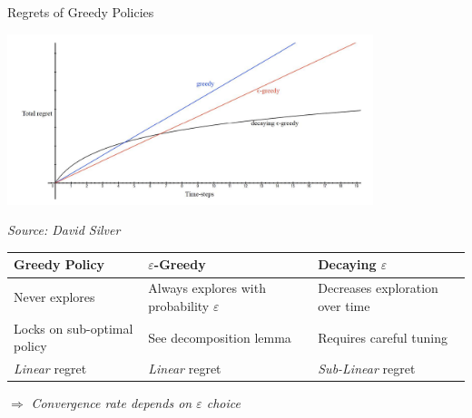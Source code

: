 \documentclass[11pt,table]{beamer}
\begin{document}
\begin{frame}{Regrets of Greedy Policies}

\centering
\includegraphics[width=0.8\textwidth]{figures/regrets of greedy policies.jpg}


\scriptsize\hfill\textit{Source: David Silver}
\vspace{.5em}

\centering
\renewcommand{\arraystretch}{1.2} %

\begin{tabular}{p{} p{} p{}}
\footnotesize
\textbf{Greedy Policy} & \textbf{$\varepsilon$-Greedy} & \textbf{Decaying $\varepsilon$} \\
\toprule
Never explores & Always explores with probability $\varepsilon$ & Decreases exploration over time \\
Locks on sub-optimal policy & See decomposition lemma & Requires careful tuning \\
\emph{Linear} regret & \emph{Linear} regret & \emph{Sub-Linear} regret \\
\bottomrule
\end{tabular}

\vspace{1em}

\centering
\footnotesize
$\Rightarrow$ \textit{Convergence rate depends on $\varepsilon$ choice \citep{auer2002finite}}
\normalsize

\end{frame}
\end{document}
